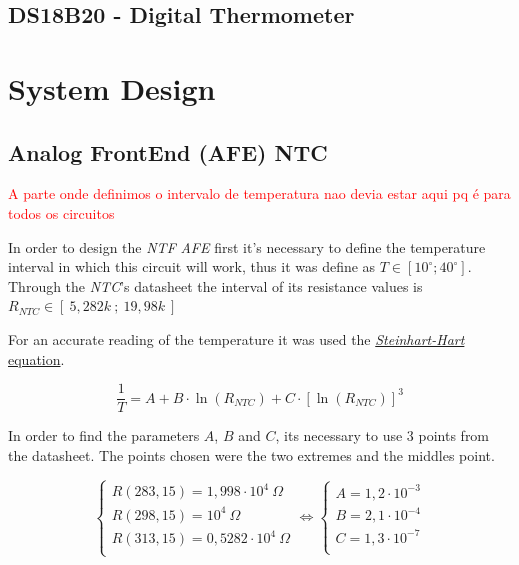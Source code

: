 \documentclass[12pt]{article}
\begin{document}
\subsection{DS18B20 - Digital Thermometer}

\section{System Design}
\subsection{Analog FrontEnd (AFE) NTC}


    \textcolor{red}{A parte onde definimos o intervalo de temperatura nao devia estar aqui pq é para todos os circuitos}


    In order to design the \textit{NTF} \textit{AFE} first it's necessary to define the temperature interval
    in which this circuit will work, thus it was define as $T \in [ 10^{\circ}; 40^{\circ} ]$. 
    Through the \textit{NTC}'s datasheet the interval of its resistance values is $R_{NTC} \in [~5,282k~;~19,98k~]$

    For an accurate reading of the temperature it was used the 
    \hyperref[eq:1]{ \textit{Steinhart-Hart} equation}.

    \begin{equation} \label{eq:1}
    \frac{1}{T} = A + B\cdot \ln(R_{NTC}) + C\cdot [\ln(R_{NTC})]^3
    \end{equation}

    In order to find the parameters $A$, $B$ and $C$, its necessary to use 3 points from the datasheet. 
    The points chosen were the two extremes and the middles point.

    \begin{equation}
        \begin{cases}
        
            R( 283,15 ) = 1,998\cdot 10^4 ~\Omega \\
            R( 298,15 ) = 10^4 ~\Omega\\
            R( 313,15 ) = 0,5282 \cdot 10^4 ~\Omega\\
        
        \end{cases}
        \Leftrightarrow
        \begin{cases}
            A = 1,2 \cdot 10^{-3}\\
            B = 2,1 \cdot 10^{-4}\\
            C = 1,3 \cdot 10^{-7}\\
        
        \end{cases}
    \end{equation}
\end{document}
